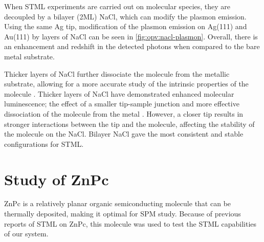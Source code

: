 
\begin{figure} [h]
    \centering
    \caption{}
    \label{fig:opv:metal-plasmon}
\end{figure}



When \ac{STML} experiments are carried out on molecular species, they are decoupled by a bilayer (2\ac{ML}) NaCl, which can modify the plasmon emission. Using the same Ag tip, modification of the plasmon emission on Ag(111) and Au(111) by layers of NaCl can be seen in \autoref{fig:opv:nacl-plasmon}. Overall, there is an enhancement and redshift in the detected photons when compared to the bare metal substrate.


\begin{figure} [h]
    \centering
    \caption{}
    \label{fig:opv:nacl-plasmon}
\end{figure}

Thicker layers of NaCl further dissociate the molecule from the metallic substrate, allowing for a more accurate study of the intrinsic properties of the molecule \citep{repp2005molecules}. Thicker layers of NaCl have demonstrated enhanced molecular luminescence; the effect of a smaller tip-sample junction and more effective dissociation of the molecule from the metal \citep{Zhang2017,Kroger2018}. However, a closer tip results in stronger interactions between the tip and the molecule, affecting the stability of the molecule on the NaCl. Bilayer NaCl gave the most consistent and stable configurations for \ac{STML}.



\section{Study of {ZnPc}}

\ac{ZnPc} is a relatively planar organic semiconducting molecule that can be thermally deposited, making it optimal for \ac{SPM} study. Because of previous reports of \ac{STML} on ZnPc, this molecule was used to test the \ac{STML} capabilities of our system. 

